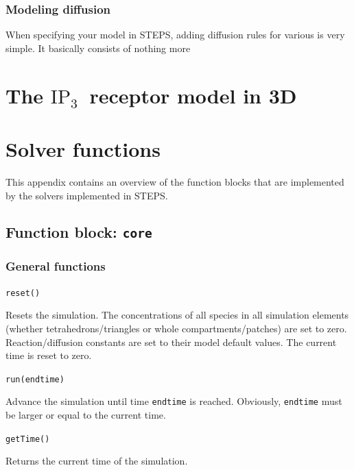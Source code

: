 \documentclass[a4paper,12pt]{book}
\newcommand{\inspt}[0]{\ensuremath{\textrm{IP}_3}}
\begin{document}
\subsection{Modeling diffusion}
When specifying your model in STEPS, adding diffusion rules for various  is very simple. It basically consists of nothing more 

\chapter{The \inspt\ receptor model in 3D}

\appendix

\chapter{Solver functions}\label{app:solverfunctions}

This appendix contains an overview of the function blocks that are implemented by the solvers implemented in STEPS.

\section{Function block: \texttt{core}}\label{app:solverfunctions:core}

\subsection{General functions}
{\setlength{\parskip}{12pt} \setlength{\parindent}{0pt}

\texttt{reset()}

Resets the simulation. The concentrations of all species in all simulation elements (whether tetrahedrons/triangles or whole compartments/patches) are set to zero. Reaction/diffusion constants are set to their model default values. The current time is reset to zero.

\texttt{run(endtime)}

Advance the simulation until time \texttt{endtime} is reached. Obviously, \texttt{endtime} must be larger or equal to the current time.

\texttt{getTime()}

Returns the current time of the simulation.
}
\end{document}

